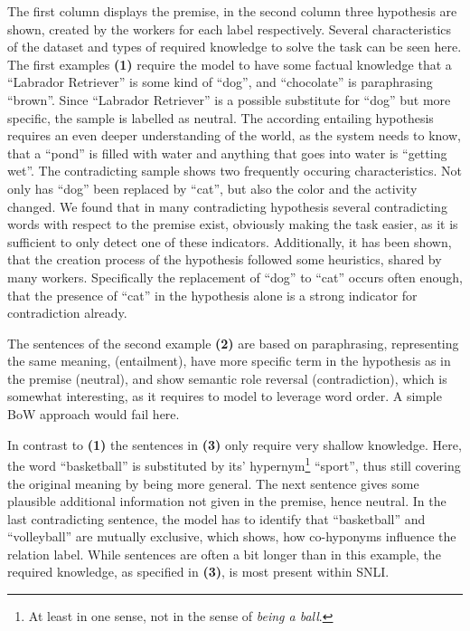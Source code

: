 The first column displays the premise, in the second column three hypothesis are shown, created by the workers for each label respectively. Several characteristics of the dataset and types of required knowledge to solve the task can be seen here. 
The first examples \textbf{(1)} require the model to have some factual knowledge that a ``Labrador Retriever'' is some kind of ``dog'', and ``chocolate'' is paraphrasing ``brown''. Since ``Labrador Retriever'' is a possible substitute for ``dog'' but more specific, the sample is labelled as neutral. The according entailing hypothesis requires an even deeper understanding of the world, as the system needs to know, that a ``pond'' is filled with water and anything that goes into water is ``getting wet''. The contradicting sample shows two frequently occuring characteristics. Not only has ``dog'' been replaced by ``cat'', but also the color and the activity changed. We found that in many contradicting hypothesis several contradicting words with respect to the premise exist, obviously making the task easier, as it is sufficient to only detect one of these indicators. Additionally, it has been shown, that the creation process of the hypothesis followed some heuristics, shared by many workers\citep{gururangan2018annotation}. Specifically the replacement of ``dog'' to ``cat'' occurs often enough, that the presence of ``cat'' in the hypothesis alone is a strong indicator for contradiction already. 
\newline

\noindent
The sentences of the second example \textbf{(2)} are based on paraphrasing, representing the same meaning, (entailment), have more specific term in the hypothesis as in the premise (neutral), and show semantic role reversal (contradiction),  which is somewhat interesting, as it requires to model to leverage word order. A simple \ac{BoW} approach would fail here.
\newline

\noindent
In contrast to \textbf{(1)} the sentences in \textbf{(3)} only require very shallow knowledge. Here, the word ``basketball'' is substituted by its' hypernym\footnote{At least in one sense, not in the sense of \textit{being a ball}.} ``sport'', thus still covering the original meaning by being more general. The next sentence gives some plausible additional information not given in the premise, hence neutral. In the last contradicting sentence, the model has to identify that ``basketball'' and ``volleyball'' are mutually exclusive, which shows, how co-hyponyms influence the relation label. While sentences are often a bit longer than in this example, the required knowledge, as specified in \textbf{(3)}, is most present within \ac{SNLI}.

